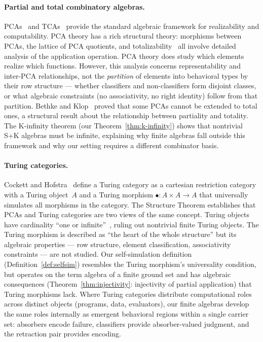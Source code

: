 \documentclass[sigconf,screen,review,anonymous]{acmart}
\theoremstyle{remark}
\begin{document}
\paragraph{Partial and total combinatory algebras.}
PCAs~\cite{vanoosten08,longley15} and TCAs~\cite{bethke88} provide the standard algebraic framework for realizability and computability. PCA theory has a rich structural theory: morphisms between PCAs, the lattice of PCA quotients, and totalizability~\cite{bethke96} all involve detailed analysis of the application operation. PCA theory does study which elements realize which functions. However, this analysis concerns representability and inter-PCA relationships, not the \emph{partition} of elements into behavioral types by their row structure --- whether classifiers and non-classifiers form disjoint classes, or what algebraic constraints (no associativity, no right identity) follow from that partition. Bethke and Klop~\cite{bethke96} proved that some PCAs cannot be extended to total ones, a structural result about the relationship between partiality and totality. The K-infinity theorem (our Theorem~\ref{thm:k-infinity}) shows that nontrivial S+K algebras must be infinite, explaining why finite algebras fall outside this framework and why our setting requires a different combinator basis.

\paragraph{Turing categories.}
Cockett and Hofstra~\cite{cockett08} define a Turing category as a cartesian restriction category with a Turing object~$A$ and a Turing morphism $\bullet : A \times A \to A$ that universally simulates all morphisms in the category. The Structure Theorem establishes that PCAs and Turing categories are two views of the same concept. Turing objects have cardinality ``one or infinite''~\cite{cockett08}, ruling out nontrivial finite Turing objects. The Turing morphism is described as ``the heart of the whole structure'' but its algebraic properties --- row structure, element classification, associativity constraints --- are not studied. Our self-simulation definition (Definition~\ref{def:selfsim}) resembles the Turing morphism's universality condition, but operates on the term algebra of a finite ground set and has algebraic consequences (Theorem~\ref{thm:injectivity}: injectivity of partial application) that Turing morphisms lack. Where Turing categories distribute computational roles across distinct objects (programs, data, evaluators), our finite algebras develop the same roles internally as emergent behavioral regions within a single carrier set: absorbers encode failure, classifiers provide absorber-valued judgment, and the retraction pair provides encoding.
\end{document}
